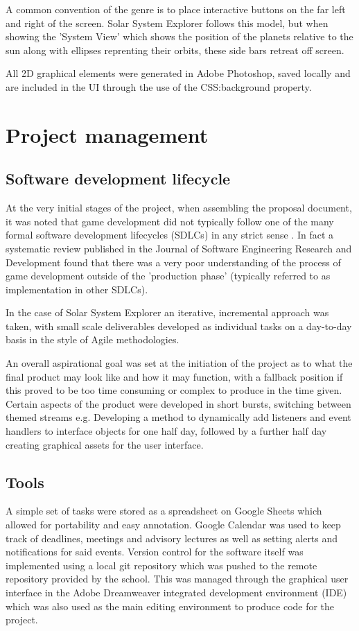 \documentclass[twoside]{bhamthesis}
\begin{document}
A common convention of the genre is to place interactive buttons on the far left and right of the screen. Solar System Explorer follows this model, but when showing the 'System View' which shows the position of the planets relative to the sun along with ellipses reprenting their orbits, these side bars retreat off screen.

All 2D graphical elements were generated in Adobe Photoshop, saved locally and are included in the UI through the use of the CSS:background property.


\section{Project management}

\subsection{Software development lifecycle}
At the very initial stages of the project, when assembling the proposal document, it was noted that game development did not typically follow one of the many formal software development lifecycles (SDLCs) in any strict sense \cite{ramadan_game_2013}. In fact a systematic review published in the Journal of Software Engineering Research and Development found that there was a very poor understanding of the process of game development outside of the 'production phase' (typically referred to as implementation in other SDLCs).

In the case of Solar System Explorer an iterative, incremental approach was taken, with small scale deliverables developed as individual tasks on a day-to-day basis in the style of Agile methodologies.

An overall aspirational goal was set at the initiation of the project as to what the final product may look like and how it may function, with a fallback position if this proved to be too time consuming or complex to produce in the time given. Certain aspects of the product were developed in short bursts, switching between themed streams e.g. Developing a method to dynamically add listeners and event handlers to interface objects for one half day, followed by a further half day creating graphical assets for the user interface.


\subsection{Tools}
A simple set of tasks were stored as a spreadsheet on Google Sheets which allowed for portability and easy annotation. Google Calendar was used to keep track of deadlines, meetings and advisory lectures as well as setting alerts and notifications for said events. Version control for the software itself was implemented using a local git repository which was pushed to the remote repository provided by the school. This was managed through the graphical user interface in the Adobe Dreamweaver integrated development environment (IDE) which was also used as the main editing environment to produce code for the project.
\end{document}
